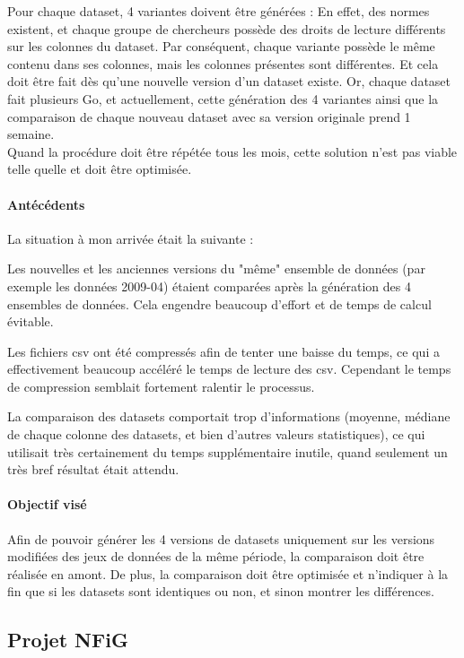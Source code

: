 Pour chaque dataset, 4 variantes doivent être générées : En effet, des normes existent, et chaque groupe de chercheurs possède des droits de lecture différents sur les colonnes du dataset.
Par conséquent, chaque variante possède le même contenu dans ses colonnes, mais les colonnes présentes sont différentes.
Et cela doit être fait dès qu'une nouvelle version d'un dataset existe.
Or, chaque dataset fait plusieurs Go, et actuellement, cette génération des 4 variantes ainsi que la comparaison de chaque nouveau dataset avec sa version originale prend 1 semaine. 
\\

Quand la procédure doit être répétée tous les mois, cette solution n'est pas viable telle quelle et doit être optimisée.

\paragraph{Antécédents}

La situation à mon arrivée était la suivante :

Les nouvelles et les anciennes versions du "même" ensemble de données (par exemple les données 2009-04) étaient comparées après la génération des 4 ensembles de données.
Cela engendre beaucoup d'effort et de temps de calcul évitable.

Les fichiers csv ont été compressés afin de tenter une baisse du temps, ce qui a effectivement beaucoup accéléré le temps de lecture des csv. 
Cependant le temps de compression semblait fortement ralentir le processus. 

La comparaison des datasets comportait trop d'informations (moyenne, médiane de chaque colonne des datasets, et bien d'autres valeurs statistiques), ce qui utilisait très certainement du temps supplémentaire inutile, quand seulement un très bref résultat était attendu.

\paragraph{Objectif visé}

Afin de pouvoir générer les 4 versions de datasets uniquement sur les versions modifiées des jeux de données de la même période, la comparaison doit être réalisée en amont.
De plus, la comparaison doit être optimisée et n'indiquer à la fin que si les datasets sont identiques ou non, et sinon montrer les différences.
\\
\subsection{Projet NFiG}

